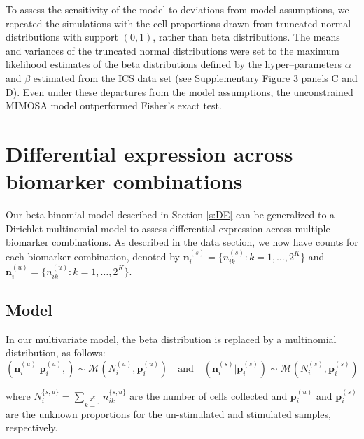 \documentclass[12pt,oupdraft]{biostatistics}
\begin{document}
To assess the sensitivity of the model to deviations from model assumptions, we repeated the simulations with the cell proportions drawn from  truncated normal distributions with support $(0,1)$, rather than beta distributions. The means and variances of the truncated normal distributions were set to the maximum likelihood estimates of the beta distributions defined by the hyper--parameters  $\alpha$ and $\beta$ estimated from the ICS data set (see Supplementary Figure 3 panels C and D). Even under these departures from the model assumptions, the unconstrained MIMOSA model outperformed Fisher's exact test.

\section{Differential expression across biomarker combinations}
\label{s:demarkercombos}
Our beta-binomial model described in Section \ref{s:DE} can be generalized to a Dirichlet-multinomial model to assess differential expression across multiple biomarker combinations. As described in the data section, we now have counts for each biomarker combination, denoted by  $\mathbf{n}^{(s)}_{i}=\{n^{(s)}_{ik}: k=1,\dots,2^K\}$ and $\mathbf{n}^{(u)}_{i}=\{n^{(u)}_{ik}: k=1,\dots,2^K\}$.

\subsection{Model}

In our multivariate model, the beta distribution is replaced by a multinomial distribution, as follows:
\begin{equation*}
 (\mathbf{n}^{(u)}_{i}|\mathbf{p}^{(u)}_{i},) \sim \mathcal{M}(N^{(u)}_{i},\mathbf{p}^{(u)}_{i})\quad\text{and}\quad (\mathbf{n}^{(s)}_{i}|\mathbf{p}^{(s)}_{i}) \sim \mathcal{M}(N^{(s)}_{i},\mathbf{p}^{(s)}_{i})\label{eq:mult_likeliehood}
 \end{equation*}

where $N^{\{s,u\}}_{i}=\sum\limits_{k=1}\limits^{2^K} n^{\{s,u\}}_{ik}$ are the number of cells collected and $\mathbf{p}^{(u)}_{i}$ and $\mathbf{p}^{(s)}_{i}$ are the unknown proportions for the un-stimulated and stimulated samples, respectively.
\end{document}
